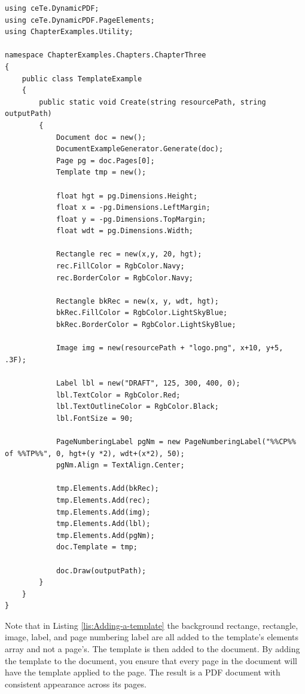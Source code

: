 \documentclass[american,letterpaper]{tufte-book}
\numberwithin{equation}{section}
\numberwithin{figure}{section}
\begin{document}
\bgroup{}
\begin{lstlisting}[caption={Adding a template to a PDF document.},label={lis:Adding-a-template},basicstyle={\small\ttfamily},breaklines=true]
using ceTe.DynamicPDF;
using ceTe.DynamicPDF.PageElements;
using ChapterExamples.Utility;

namespace ChapterExamples.Chapters.ChapterThree
{
    public class TemplateExample
    {
        public static void Create(string resourcePath, string outputPath)
        {
            Document doc = new();
            DocumentExampleGenerator.Generate(doc);
            Page pg = doc.Pages[0];
            Template tmp = new();

            float hgt = pg.Dimensions.Height;
            float x = -pg.Dimensions.LeftMargin;
            float y = -pg.Dimensions.TopMargin;
            float wdt = pg.Dimensions.Width;

            Rectangle rec = new(x,y, 20, hgt);
            rec.FillColor = RgbColor.Navy;
            rec.BorderColor = RgbColor.Navy;

            Rectangle bkRec = new(x, y, wdt, hgt);
            bkRec.FillColor = RgbColor.LightSkyBlue;
            bkRec.BorderColor = RgbColor.LightSkyBlue;

            Image img = new(resourcePath + "logo.png", x+10, y+5, .3F);

            Label lbl = new("DRAFT", 125, 300, 400, 0);
            lbl.TextColor = RgbColor.Red;
            lbl.TextOutlineColor = RgbColor.Black;
            lbl.FontSize = 90;

            PageNumberingLabel pgNm = new PageNumberingLabel("%%CP%% of %%TP%%", 0, hgt+(y *2), wdt+(x*2), 50);
            pgNm.Align = TextAlign.Center;

            tmp.Elements.Add(bkRec);
            tmp.Elements.Add(rec);
            tmp.Elements.Add(img);
            tmp.Elements.Add(lbl);
            tmp.Elements.Add(pgNm);
            doc.Template = tmp;
            
            doc.Draw(outputPath);
        }
    }
}
\end{lstlisting}
\leavevmode\egroup
Note that in Listing \ref{lis:Adding-a-template} the background rectange, rectangle, image, label, and page numbering label are all added to the template's elements array and not a page's. The template is then added to the document. By adding the template to the document, you ensure that every page in the document will have the template applied to the page. The result is a PDF document with consistent appearance across its pages.
\end{document}
